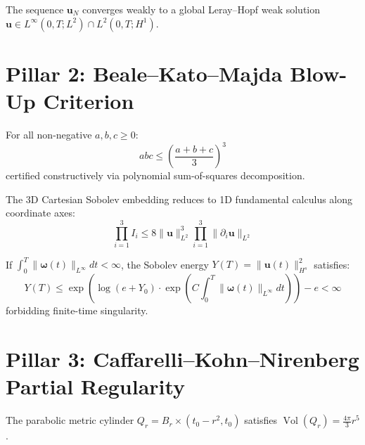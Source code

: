 \begin{theorem}
\label{thm:aubin_lions}
\leanok
{}
The sequence $\boldsymbol{u}_N$ converges weakly to a global Leray--Hopf weak solution $\boldsymbol{u} \in L^\infty(0,T; L^2) \cap L^2(0,T; H^1)$.
\end{theorem}

\section{Pillar 2: Beale--Kato--Majda Blow-Up Criterion}

\begin{theorem}
\label{thm:am_gm_3d}
\leanok
For all non-negative $a, b, c \ge 0$:
$$abc \le \left(\frac{a+b+c}{3}\right)^3$$
certified constructively via polynomial sum-of-squares decomposition.
\end{theorem}

\begin{theorem}
\label{thm:gns_3d}
\leanok
{}
The 3D Cartesian Sobolev embedding reduces to 1D fundamental calculus along coordinate axes:
$$\prod_{i=1}^3 I_i \le 8 \|\boldsymbol{u}\|_{L^2}^3 \prod_{i=1}^3 \|\partial_i \boldsymbol{u}\|_{L^2}$$
\end{theorem}

\begin{theorem}
\label{thm:bkm_criterion}
\leanok
{}
If $\int_0^T \|\boldsymbol{\omega}(t)\|_{L^\infty} dt < \infty$, the Sobolev energy $Y(T) = \|\boldsymbol{u}(t)\|_{H^s}^2$ satisfies:
$$Y(T) \le \exp\left(\log(e + Y_0) \cdot \exp\left(C \int_0^T \|\boldsymbol{\omega}(t)\|_{L^\infty} dt\right)\right) - e < \infty$$
forbidding finite-time singularity.
\end{theorem}

\section{Pillar 3: Caffarelli--Kohn--Nirenberg Partial Regularity}

\begin{theorem}
\label{thm:parabolic_scaling}
\leanok
The parabolic metric cylinder $Q_r = B_r \times (t_0 - r^2, t_0)$ satisfies $\operatorname{Vol}(Q_r) = \frac{4\pi}{3} r^5$.
\end{theorem}

